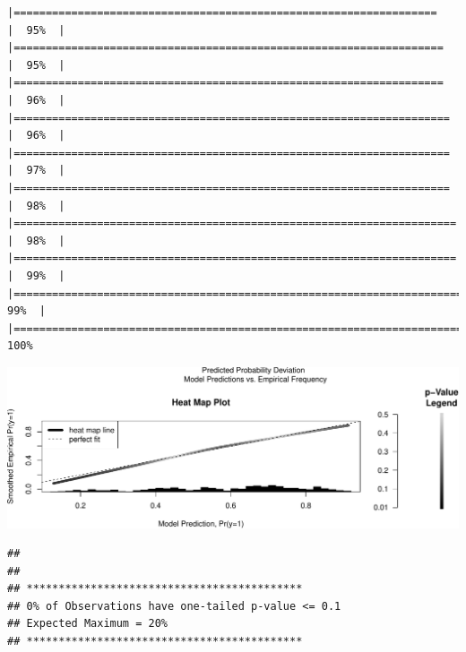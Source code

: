\documentclass[
  ignorenonframetext,
]{beamer}
\begin{document}
\begin{frame}[fragile]{}
\begin{verbatim}
|==================================================================    |  95%  |                                                                              |===================================================================   |  95%  |                                                                              |===================================================================   |  96%  |                                                                              |====================================================================  |  96%  |                                                                              |====================================================================  |  97%  |                                                                              |====================================================================  |  98%  |                                                                              |===================================================================== |  98%  |                                                                              |===================================================================== |  99%  |                                                                              |======================================================================|  99%  |                                                                              |======================================================================| 100%
\end{verbatim}

\includegraphics{week4_p1_files/figure-beamer/heatmap_prop_model-1.pdf}

\begin{verbatim}
## 
##  
## ******************************************* 
## 0% of Observations have one-tailed p-value <= 0.1
## Expected Maximum = 20% 
## *******************************************
\end{verbatim}
\end{frame}
\end{document}

